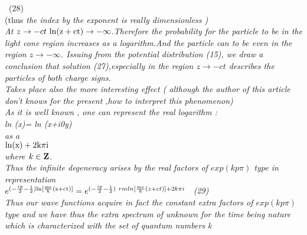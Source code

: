 \documentclass[a4paper,12pt] {article}
\begin{document}
{\ (28)
\\(thus \it the index by the exponent is really dimensionless \rm )
\\  At $ z\to -ct \ \rm  ln(z+ct)\to -\infty$.Therefore the  probability for the particle to be in the light cone region
 increases as a \it logarithm.\rm And the particle can to be even in the region $ z \to -\infty$. Issuing from
 the potential distribution (15), we draw a conclusion that
\it  solution \rm (27),\it  especially in the region $ z\to -ct$ \it  describes the particles of both charge signs.
\\ \rm Takes place also the more interesting effect ( although the author of this article don't   knows for
the present ,how to interpret this phenomenon)
\\As it is well known , one can represent the real  logarithm :\\ \rm ln (x)= \rm ln (x+i0y) \\ as a \\ $\rm ln(x) +2k \pi i $
\\
 where $ k \in \bf Z$.\\ \rm Thus \it the infinite degeneracy \rm arises  by the real factors of $ exp (kp \pi) $ type
 in representation  \\$ e^{(- \frac {ip}{2}-\frac {1}{2})\rm ln[\frac {mc}{\hbar} (z+ct)]} =
e^{(- \frac {ip}{2}-\frac {1}{2})\ rm ln[\frac  {mc}{\hbar} (z+ct)]+2k\pi i }$ \ (29)
\\ Thus \it our wave functions acquire in fact the constant extra factors of  $ exp (kp \pi) $ \it type \rm and
we have thus \it the extra spectrum \rm of unknown for the time being nature which is \it  characterized
with the set of quantum numbers \rm k
}
\end{document}
